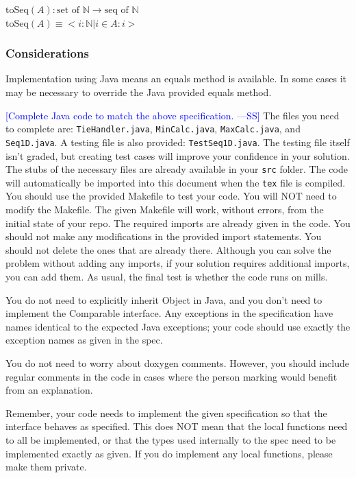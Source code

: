 \documentclass[12pt,fleqn]{examtst}
\newcommand{\authornote}[3]{\textcolor{#1}{[#3 ---#2]}}
\newcommand{\authornote}[3]{}
\newcommand{\wss}[1]{\authornote{blue}{SS}{#1}}
\begin{document}
\noindent $\mbox{toSeq}(A): \mbox{set of } \mathbb{N} \rightarrow \mbox{seq of }
\mathbb{N}$\\
\noindent $\mbox{toSeq}(A) \equiv < i: \mathbb{N} | i \in A : i > $

\subsubsection* {Considerations}

Implementation using Java means an equals method is available.  In some cases it
may be necessary to override the Java provided equals method.


\newpage

\noindent
\begin{minipage}{\textwidth}
 \label{Q_JavaCode}

\wss{Complete Java code to match the above specification.}  The files you need
to complete are: \texttt{TieHandler.java}, \texttt{MinCalc.java},
\texttt{MaxCalc.java}, and \texttt{Seq1D.java}.  A testing file is also
provided: \texttt{TestSeq1D.java}.  The testing file itself isn't graded, but
creating test cases will improve your confidence in your solution.  The stubs of
the necessary files are already available in your \texttt{src} folder.  The code
will automatically be imported into this document when the \texttt{tex} file is
compiled.  You should use the provided Makefile to test your code.  You will NOT
need to modify the Makefile.
The given Makefile will work, without errors, from the initial state of your
repo.  The required imports are already given in the code.  You should not make
any modifications in the provided import statements.  You should not delete the
ones that are already there.  Although you can solve the problem without adding
any imports, if your solution requires additional imports, you can add them.  As
usual, the final test is whether the code runs on mills.

You do not need to explicitly inherit Object in Java, and you don't need to
implement the Comparable interface.  Any exceptions in the specification have
names identical to the expected Java exceptions; your code should use exactly the
exception names as given in the spec.

You do not need to worry about doxygen comments.  However, you should include
regular comments in the code in cases where the person marking would benefit
from an explanation.

Remember, your code needs to implement the given specification so that the
interface behaves as specified.  This does NOT mean that the local functions
need to all be implemented, or that the types used internally to the spec need
to be implemented exactly as given.  If you do implement any local functions,
please make them private.\\

\end{minipage}
\end{document}
